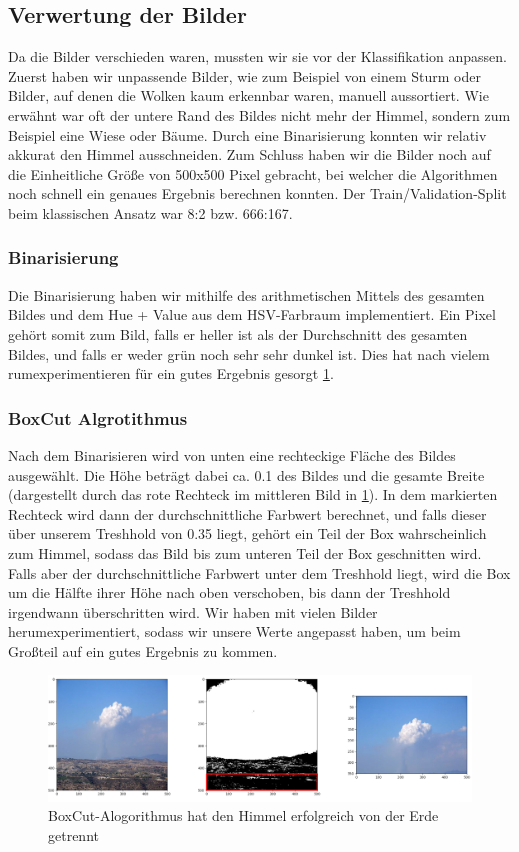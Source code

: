 \documentclass[a4,german]{article}
\begin{document}
\subsection{Verwertung der Bilder}
Da die Bilder verschieden waren, mussten wir sie vor der Klassifikation anpassen.
Zuerst haben wir unpassende Bilder, wie zum Beispiel von einem Sturm oder Bilder, auf denen die Wolken kaum erkennbar waren, manuell aussortiert.
Wie erwähnt war oft der untere Rand des Bildes nicht mehr der Himmel, sondern zum Beispiel eine Wiese oder Bäume.
Durch eine Binarisierung konnten wir relativ akkurat den Himmel ausschneiden.
Zum Schluss haben wir die Bilder noch auf die Einheitliche Größe von 500x500 Pixel gebracht, bei welcher die Algorithmen noch schnell ein genaues Ergebnis berechnen konnten. Der Train/Validation-Split beim klassischen Ansatz war 8:2 bzw. 666:167.

\subsubsection{Binarisierung}
Die Binarisierung haben wir mithilfe des arithmetischen Mittels des gesamten Bildes und dem Hue + Value aus dem HSV-Farbraum implementiert.
Ein Pixel gehört somit zum Bild, falls er heller ist als der Durchschnitt des gesamten Bildes, und falls er weder grün noch sehr sehr dunkel ist. Dies hat nach vielem rumexperimentieren für ein gutes Ergebnis gesorgt \ref{fig:boxAlg}. 
\subsubsection{BoxCut Algrotithmus}
Nach dem Binarisieren wird von unten eine rechteckige Fläche des Bildes ausgewählt. Die Höhe beträgt dabei ca. 0.1 des Bildes und die gesamte Breite (dargestellt durch das rote Rechteck im mittleren Bild in \ref{fig:boxAlg}). In dem markierten Rechteck wird dann der durchschnittliche Farbwert berechnet, und falls dieser über unserem Treshhold von 0.35 liegt, gehört ein Teil der Box wahrscheinlich zum Himmel, sodass das Bild bis zum unteren Teil der Box geschnitten wird.
Falls aber der durchschnittliche Farbwert unter dem Treshhold liegt, wird die Box um die Hälfte ihrer Höhe nach oben verschoben, bis dann der Treshhold irgendwann überschritten wird.
Wir haben mit vielen Bilder herumexperimentiert, sodass wir unsere Werte angepasst haben, um beim Großteil auf ein gutes Ergebnis zu kommen.


\begin{figure}[h!]
\centering
\includegraphics[width=1.1\textwidth]{boxAlg} %
\caption{BoxCut-Alogorithmus hat den Himmel erfolgreich von der Erde getrennt}
\label{fig:boxAlg}
\end{figure}
\end{document}
